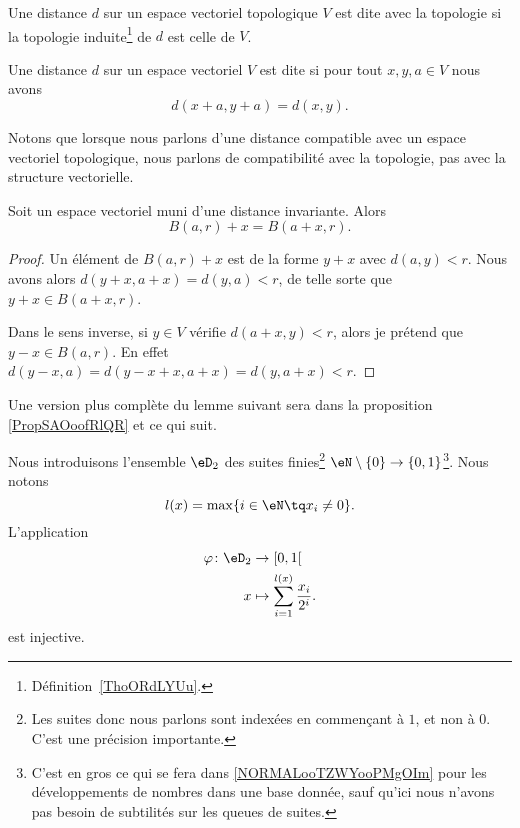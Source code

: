 \begin{definition}      \label{DEFooGTOZooRcvGHg}
	Une distance \( d\) sur un espace vectoriel topologique \( V\) est dite  avec la topologie si la topologie induite\footnote{Définition~\ref{ThoORdLYUu}.} de \( d\) est celle de \( V\).
\end{definition}

\begin{definition}      \label{DEFooEUXVooEBYhNU}
	Une distance \( d\) sur un espace vectoriel \( V\) est dite  si pour tout \( x,y,a\in V\) nous avons
	\begin{equation}
		d(x+a,y+a)=d(x,y).
	\end{equation}
\end{definition}
Notons que lorsque nous parlons d'une distance compatible avec un espace vectoriel topologique, nous parlons de compatibilité avec la topologie, pas avec la structure vectorielle.

\begin{lemma}        \label{LEMooZNBAooOhEwJd}
	Soit un espace vectoriel muni d'une distance invariante. Alors
	\begin{equation}
		B(a,r)+x=B(a+x,r).
	\end{equation}
\end{lemma}

\begin{proof}
	Un élément de \( B(a,r)+x\) est de la forme \( y+x\) avec \( d(a,y)<r\). Nous avons alors \( d(y+x,a+x)=d(y,a)<r\), de telle sorte que \( y+x\in B(a+x,r)\).

	Dans le sens inverse, si \( y\in V\) vérifie \( d(a+x,y)<r\), alors je prétend que \( y-x\in B(a,r)\). En effet \( d(y-x,a)=d(y-x+x,a+x)=d(y,a+x)<r\).
\end{proof}

Une version plus complète du lemme suivant sera dans la proposition \ref{PropSAOoofRlQR} et ce qui suit.
\begin{lemma}      \label{LEMooIQBXooUEtdoy}
	Nous introduisons l'ensemble \( \eD_2\) des suites finies\footnote{Les suites donc nous parlons sont indexées en commençant à \( 1\), et non à \( 0\). C'est une précision importante.} \( \eN\setminus\{ 0 \}\to \{ 0,1 \}\)\footnote{C'est en gros ce qui se fera dans \ref{NORMALooTZWYooPMgOIm} pour les développements de nombres dans une base donnée, sauf qu'ici nous n'avons pas besoin de subtilités sur les queues de suites.}. Nous notons
	\begin{equation}
		l(x)=\max\{ i\in \eN\tq x_i\neq 0 \}.
	\end{equation}
	L'application
	\begin{equation}
		\begin{aligned}
			\varphi\colon \eD_2 & \to \mathopen[ 0 , 1 \mathclose[              \\
			x                   & \mapsto \sum_{i=1}^{l(x)}\frac{ x_i }{ 2^i }.
		\end{aligned}
	\end{equation}
	est injective.
\end{lemma}

